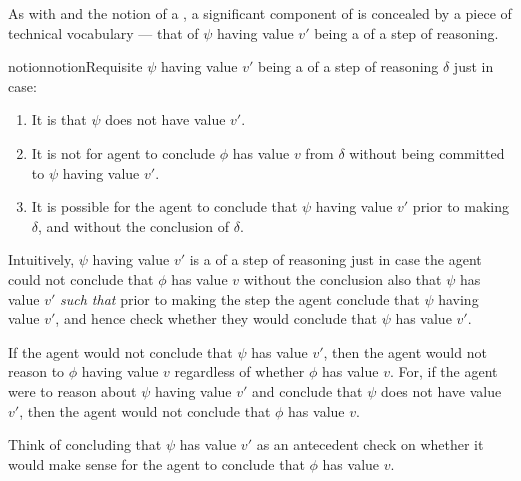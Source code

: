 \begin{note}
  As with \ideaS{} and the notion of a \sink{}, a significant component of \ideaCS{} is concealed by a piece of technical vocabulary --- that of \(\psi\) having value \(v'\) being a \requ{} of a step of reasoning.

  \begin{restatable}[A \requ{0}]{notion}{notionRequisite}
    \label{notion:requ}
    \(\psi\) having value \(v'\) being a \requ{} of a step of reasoning \(\delta\) just in case:
    \begin{enumerate}
    \item
      \label{notion:requ:psi}
      It is \epVAd{} that \(\psi\) does not have value \(v'\).
    \item
      \label{notion:requ:need-psi}
      It is not \epVAd{} for agent to conclude \(\phi\) has value \(v\) from \(\delta\) without being committed to \(\psi\) having value \(v'\).
    \item
      \label{notion:requ:possible-psi}
      It is possible for the agent to conclude that \(\psi\) having value \(v'\) prior to making \(\delta\), and without the conclusion of \(\delta\).
    \end{enumerate}
    \vspace{-\baselineskip}
  \end{restatable}
\end{note}

\begin{note}
  Intuitively, \(\psi\) having value \(v'\) is a \requ{} of a step of reasoning just in case the agent could not conclude that \(\phi\) has value \(v\) without the conclusion also  that \(\psi\) has value \(v'\) \emph{such that} prior to making the step the agent conclude that \(\psi\) having value \(v'\), and hence check whether they would conclude that \(\psi\) has value \(v'\).

  If the agent would not conclude that \(\psi\) has value \(v'\), then the agent would not reason to \(\phi\) having value \(v\) {\color{red} regardless of whether \(\phi\) has value \(v\)}.
  For, if the agent were to reason about \(\psi\) having value \(v'\) and conclude that \(\psi\) does not have value \(v'\), then the agent would not conclude that \(\phi\) has value \(v\).
\end{note}

\begin{note}
  Think of concluding that \(\psi\) has value \(v'\) as an antecedent check on whether it would make sense for the agent to conclude that \(\phi\) has value \(v\).
\end{note}

